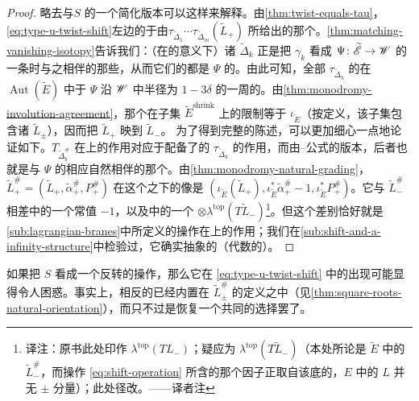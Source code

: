 \begin{proof}
略去\trBraneStructure{}与\trSuspension{}$S$ 的一个简化版本可以这样来解释。由\cref{thm:twist-equals-tau}，\eqref{eq:type-u-twist-shift}左边的\trObject{}\trIsomorphic{}于由\trLagrange\trSubmanifold{}$\tau_{\widetilde{\Delta}_1}\cdots\tau_{\widetilde{\Delta}_m}(\widetilde{L}_{+})$ 所给出的那个\trObject。\cref{thm:matching-vanishing-isotopy}告诉我们：（在\trFrame\trIsotopy{}的意义下）诸 $\widetilde{\Delta}_k$ 正是把 $\gamma_k$ 看成 $\Psi\colon\widetilde{\mathscr{E}}\to\mathscr{W}$ 的一条\trVanishingPath{}时与之相伴的那些\trVanishingCycle，从而它们的\trDehnTwist{}都是 $\Psi$ 的\trMonodromy。由此可知，全部 $\tau_{\widetilde{\Delta}_k}$ 的\trComposition{}在 $\operatorname{Aut}(\widetilde{E})$ 中\trIsotopy{}于 $\Psi$ 沿 $\mathscr{W}$ 中半径为 $1-3\delta$ 的\trCircle{}一周的\trMonodromy。由\cref{thm:monodromy-involution-agreement}，那个\trMonodromy{}在子集 $\widetilde{E}^{\mathrm{shrink}}$ 上的限制等于 $\iota_{\widetilde{E}}$（按定义，该子集包含诸 $\widetilde{L}_{\pm}$），因而把 $\widetilde{L}_{+}$ 映到 $\widetilde{L}_{-}$。
为了得到完整的陈述，可以更加细心一点地论证如下。$T_{\widetilde{\Delta}^{\#}_k}$ 在\trObject{}上的作用对应于配备了\trCanonical\trGrading{}的 $\tau_{\widetilde{\Delta}_k}$ 的作用，而由\trPicard--\trLefschetz{}公式的\trGraded{}版本，后者也就是与 $\Psi$ 的相应\trMonodromy{}自然相伴的那个\trGrading。由\cref{thm:monodromy-natural-grading}，$\widetilde{L}^{\#}_{+}=(\widetilde{L}_{+},\tilde{\alpha}^{\#}_{+},P^{\#}_{+})$ 在这个\trMonodromy{}之下的像是 $(\iota_{\widetilde{E}}(\widetilde{L}_{+}),\iota_{\widetilde{E}}^{*}\tilde{\alpha}^{\#}_{+}-1,\iota_{\widetilde{E}}^{*}P^{\#}_{+})$。它与 $\widetilde{L}^{\#}_{-}$ 相差\trGrading{}中的一个常值 $-1$，以及\trPinStructure{}中的一个 $\otimes\lambda^{\mathrm{top}}(T\widetilde{L}_{-})$\footnote{译注：原书此处印作 $\lambda^{\mathrm{top}}(TL_{-})$；疑应为 $\lambda^{\mathrm{top}}(T\widetilde{L}_{-})$（本处所论\trBrane{}是 $\widetilde{E}$ 中的 $\widetilde{L}^{\#}_{-}$，而\trSuspension{}操作 \eqref{eq:shift-operation} 所含的那个因子正取自该\trBrane{}底\trLagrange\trSubmanifold{}的\trTangentBundle，$E$ 中的 $L$ 并无 $\pm$ 分量）；此处径改。——译者注}。但这个差别恰好就是\cref{sub:lagrangian-branes}中所定义的\trSuspension{}操作在\trLagrange\trBrane{}上的作用；我们在\cref{sub:shift-and-a-infinity-structure}中检验过，它确实\trQuasiRepresent{}抽象的（代数的）\trSuspension。
\end{proof}
\begin{remark}\label{thm:shift-restores-orientation}
如果把 $S$ 看成一个反转\trLagrange\trSubmanifold{}\trOrientation{}的操作，那么它在 \eqref{eq:type-u-twist-shift} 中的出现可能显得令人困惑。事实上，相反的\trOrientation{}已经内置在 $\widetilde{L}^{\#}_{\pm}$ 的定义之中（见\cref{thm:square-roots-natural-orientation}），而\trSuspension{}只不过是恢复一个共同的选择罢了。
\end{remark}
